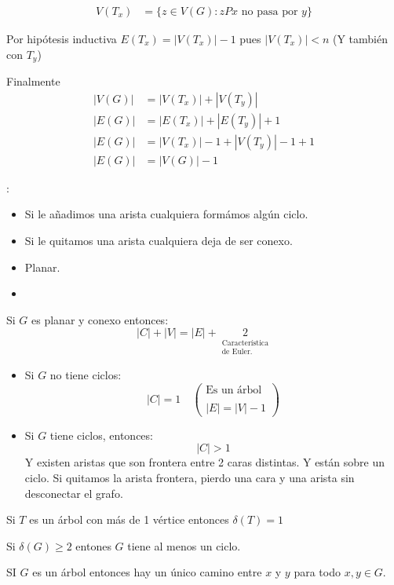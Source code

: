 \documentclass[../main.tex]{subfiles}
\begin{document}
\begin{figure}[H]
	\centering
	
\end{figure}

\begin{figure}[H]
	\centering
	
\end{figure}

\begin{align*}
	V(T_x) &=
	\{
		z\in V(G):
		zPx\text{ no pasa por $y$}
	\}
\end{align*}

Por hipótesis inductiva $E(T_x)=|V(T_x)|-1$ pues $|V(T_x)| < n$
(Y también con $T_y$)

Finalmente
\begin{align*}
	|V(G)| &= |V(T_x)| + |V(T_y)|\\
	|E(G)| &= |E(T_x)| + |E(T_y)| +1\\
	|E(G)| &= |V(T_x)| - 1 + |V(T_y)| - 1 + 1\\
	|E(G)| &= |V(G)| - 1
\end{align*}

:
\begin{itemize}
	\item {}
		{Si le añadimos una arista cualquiera formámos algún ciclo.}
	\item {}
		{Si le quitamos una arista cualquiera deja de ser conexo.}
	\item Planar.
	\item {}
\end{itemize}

Si $G$ es planar y conexo entonces:
\[
	|C| + |V| = |E| +
	\underset
	{
		\substack
		{
			\text{Característica}\\
			\text{de Euler.}
		}
	}
	{
		2
	}
\]

\begin{itemize}
	\item Si $G$ no tiene ciclos:
		\[
			|C| = 1 \quad
			\left(
				\substack
				{
					\text{Es un árbol}\\
					\text{}\\
					|E| = |V|-1
				}
			\right)
		\]

	\item Si $G$ tiene ciclos, entonces:
		\[
			|C| > 1
		\]
		Y existen aristas que son frontera entre 2 caras distintas.
		Y están sobre un ciclo.
		Si quitamos la arista frontera, pierdo una cara y una arista sin
		desconectar el grafo.
\end{itemize}

\begin{figure}[H]
	\centering
	
\end{figure}


\tarea
Si $T$ es un árbol con más de 1 vértice entonces $\delta(T)=1$

Si $\delta(G)\geq 2$ entones $G$ tiene al menos un ciclo.

SI $G$ es un árbol entonces hay un único camino entre $x$ y $y$ para todo
$x,y \in G$.
\end{document}
